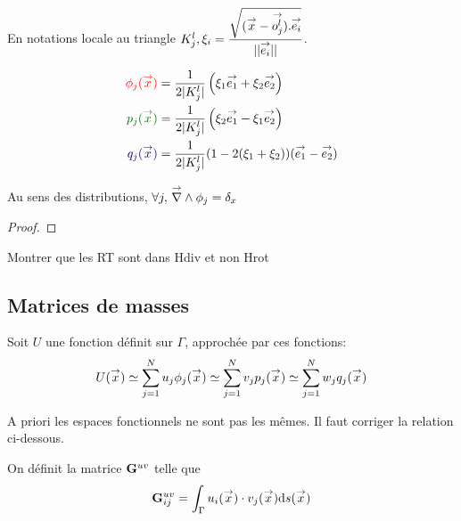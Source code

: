     En notations locale au triangle \(K_j^l, \xi_i = \frac{\sqrt{(\vx-\vect{o^l_j}).\vect{e_i}}}{||\vect{e_i}||}\).

    \begin{minipage}{0.53\textwidth}
      \centering
      \begin{tikzpicture}[scale=2.5]
        
      \end{tikzpicture}
    \end{minipage}
    \begin{minipage}{0.45\textwidth}
      \begin{align*}
        \color{red}{\phi_j(\vx)} &= \frac{1}{2|K_j^l|}\left(\xi_1 \vect{e_1} + \xi_2 \vect{e_2}\right)\\
        \color{black!60!green}{p_j(\vx)} &= \frac{1}{2|K_j^l|}\left(\xi_2 \vect{e_1} -\xi_1 \vect{e_2}\right)\\
        \color{black!60!blue}{q_j(\vx)} &= \frac{1}{2|K_j^l|}(1-2(\xi_1+\xi_2))(\vect{e_1} -\vect{e_2})
      \end{align*}
    \end{minipage}

    \begin{prop}
      Au sens des distributions, \(\forall j,\, \vrot \phi_j = \delta_x\)
    \end{prop}
    \begin{proof}
    \end{proof}

    \begin{TODO}
      Montrer que les RT sont dans Hdiv et non Hrot
    \end{TODO}

  \subsection{Matrices de masses}
    Soit \(U\) une fonction définit sur \(\Gamma\), approchée par ces fonctions: 
    \[ U(\vx) \simeq \sum\limits_{j=1}^N u_j \phi_j(\vx) \simeq \sum\limits_{j=1}^N v_j p_j(\vx) \simeq \sum\limits_{j=1}^N w_j q_j(\vx)
    \]

    \begin{TODO}
      A priori les espaces fonctionnels ne sont pas les mêmes. Il faut corriger la relation ci-dessous.
    \end{TODO}

    \begin{defn}
      On définit la matrice \(\mG{u}{v}\) telle que
      \begin{equation}
        \mG{u}{v}_{ij} = \int_\Gamma u_i(\vx)\cdot v_j(\vx) \dd{s}(\vx)
      \end{equation}
    \end{defn}

